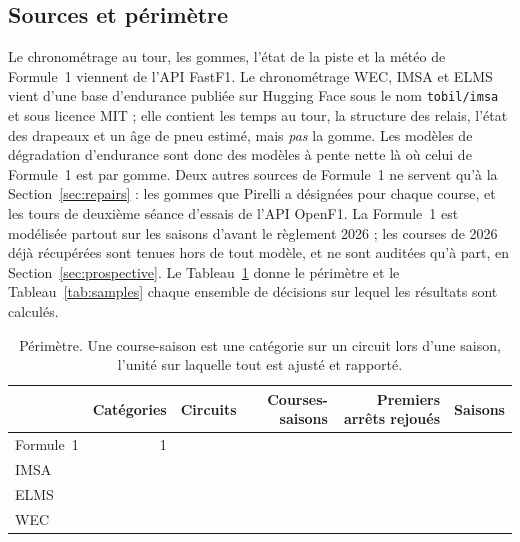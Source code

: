 \documentclass[11pt,a4paper]{article}
\begin{document}
\subsection{Sources et périmètre}

Le chronométrage au tour, les gommes, l'état de la piste et la météo de
Formule~1 viennent de l'API FastF1. Le chronométrage WEC, IMSA et ELMS vient
d'une base d'endurance publiée sur Hugging Face sous le nom
\texttt{tobil/imsa} et sous licence MIT ; elle contient les temps au tour, la
structure des relais, l'état des drapeaux et un âge de pneu estimé, mais
\emph{pas} la gomme. Les modèles de dégradation d'endurance sont donc des
modèles à pente nette là où celui de Formule~1 est par gomme. Deux autres
sources de Formule~1 ne servent qu'à la Section~\ref{sec:repairs} : les gommes
que Pirelli a désignées pour chaque course, et les tours de deuxième séance
d'essais de l'API OpenF1. La Formule~1 est modélisée partout sur les saisons
d'avant le règlement 2026 ; les \NRacesFoneHeldOut{} courses de 2026 déjà
récupérées sont tenues hors de tout modèle, et ne sont auditées qu'à part, en Section~\ref{sec:prospective}. Le
Tableau~\ref{tab:scope} donne le périmètre et le Tableau~\ref{tab:samples}
chaque ensemble de décisions sur lequel les résultats sont calculés.

\begin{table}[htbp]
\centering
\caption{Périmètre. Une course-saison est une catégorie sur un circuit lors
d'une saison, l'unité sur laquelle tout est ajusté et rapporté.}
\label{tab:scope}
\begin{tabular}{lrrrrl}
\toprule
& Catégories & Circuits & Courses-saisons & Premiers arrêts rejoués & Saisons \\
\midrule
Formule~1 & 1 & \NCircuitsFone{} & \NRacesFone{} & \NDecisionsFone{} & \SeasonsFone{} \\
IMSA      & \NClassesImsa{} & \NCircuitsImsa{} & \NRacesImsa{} & \NDecisionsImsa{} & \SeasonsImsa{} \\
ELMS      & \NClassesElms{} & \NCircuitsElms{} & \NRacesElms{} & \NDecisionsElms{} & \SeasonsElms{} \\
WEC       & \NClassesWec{} & \NCircuitsWec{} & \NRacesWec{} & \NDecisionsWec{} & \SeasonsWec{} \\
\bottomrule
\end{tabular}
\end{table}
\end{document}
